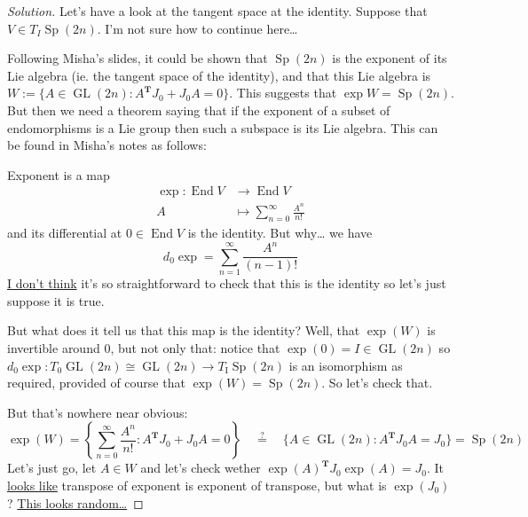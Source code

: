 \begin{proof}[Solution]
Let's have a look at the tangent space at the identity. Suppose that $V \in T_{I}\operatorname{Sp}(2n)$. I'm not sure how to continue here…

Following Misha's slides, it could be shown that $\operatorname{Sp}(2n)$ is the exponent of its Lie algebra (ie. the tangent space of the identity), and that this Lie algebra is $W:=\{A\in\operatorname{GL}(2n):A^{\mathbf{T}}J_0+J_0A=0\}$. This suggests that $\operatorname{exp}W =\operatorname{Sp}(2n)$. But then we need a theorem saying that if the exponent of a subset of endomorphisms is a Lie group then such a subspace is its Lie algebra. This can be found in Misha's notes as follows: 

Exponent is a map 
\begin{align*}
	\operatorname{exp}: \operatorname{End}V &\longrightarrow \operatorname{End}V \\
	A &\longmapsto \sum_{n=0}^{\infty}\frac{A^{n}}{n!}
\end{align*}
and its differential at $0\in\operatorname{End}V$ is the identity. But why… we have
\[d_0\operatorname{exp}=\sum_{n=1}^{\infty}\frac{A^{n}}{(n-1)!}\]
\href{https://en.wikipedia.org/wiki/Derivative_of_the_exponential_map#Statement}{I don't think} it's so straightforward to check that this is the identity so let's just suppose it is true.

But what does it tell us that this map is the identity? Well, that $\operatorname{exp}(W)$ is invertible around 0, but not only that: notice that $\operatorname{exp}(0) =I\in\operatorname{GL}(2n)$ so $d_0\operatorname{exp}: T_0\operatorname{GL}(2n)\cong \operatorname{GL}(2n)\to T_{\operatorname{I}}\operatorname{Sp}(2n)$ is an isomorphism as required, provided of course that $\operatorname{exp}(W) =\operatorname{Sp}(2n)$. So let's check that.

But that's nowhere near obvious:
\[\operatorname{exp}(W) = \left\{ \sum_{n=0}^{\infty}\frac{A^{n}}{n!}:A^{\mathbf{T}}J_0+J_0A=0 \right\}\quad \overset{?}{=}\quad \{A\in\operatorname{GL}(2n):A^{\mathbf{T}}J_0A=J_0\}=\operatorname{Sp}(2n) \]
Let's just go, let $A\in W$ and let's check wether $\operatorname{exp}(A)^{\mathbf{T}}J_0\operatorname{exp}(A) =J_0$. It \href{https://math.stackexchange.com/questions/1021900/proof-of-transpose-property-of-matrix-exponential}{looks like} transpose of exponent is exponent of transpose, but what is $\operatorname{exp}(J_0)$? \href{https://www.wolframalpha.com/input?i=exp%28%7B%7B0%2C0%2C0%2C-1%7D%2C%7B0%2C0%2C-1%2C0%7D%2C%7B0%2C1%2C0%2C0%7D%2C%7B1%2C0%2C0%2C0%7D%7D%29&lang=es}{This looks random…}

\end{proof}

